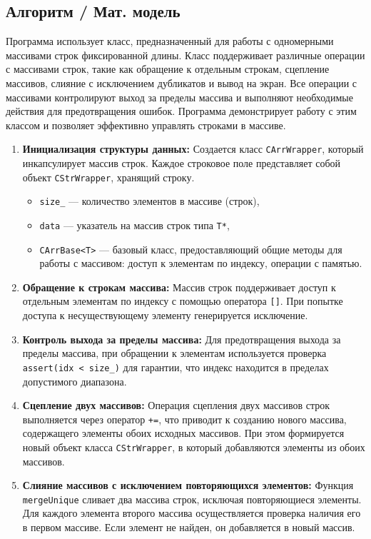 \documentclass[14pt,a4paper]{article}
\begin{document}
{\subsection{Алгоритм / Мат. модель}
Программа использует класс, предназначенный для работы с одномерными массивами
строк фиксированной длины. Класс поддерживает различные операции с массивами
строк, такие как обращение к отдельным строкам, сцепление массивов, слияние с
исключением дубликатов и вывод на экран. Все операции с массивами контролируют
выход за пределы массива и выполняют необходимые действия для предотвращения
ошибок. Программа демонстрирует работу с этим классом и позволяет эффективно
управлять строками в массиве.
\begin{enumerate}
  \item \textbf{Инициализация структуры данных:} Создается класс \texttt{CArrWrapper}, который инкапсулирует массив строк. Каждое строковое поле представляет собой объект \texttt{CStrWrapper}, хранящий строку.
    \begin{itemize}
      \item \texttt{size\_} — количество элементов в массиве (строк),
      \item \texttt{data} — указатель на массив строк типа \texttt{T*},
      \item \texttt{CArrBase<T>} — базовый класс, предоставляющий общие методы для работы с массивом: доступ к элементам по индексу, операции с памятью.
    \end{itemize}
  \item \textbf{Обращение к строкам массива:} Массив строк поддерживает доступ к отдельным элементам по индексу с помощью оператора \texttt{[]}. При попытке доступа к несуществующему элементу генерируется исключение.
  \item \textbf{Контроль выхода за пределы массива:} Для предотвращения выхода за пределы массива, при обращении к элементам используется проверка \texttt{assert(idx < size\_)} для гарантии, что индекс находится в пределах допустимого диапазона.
  \item \textbf{Сцепление двух массивов:} Операция сцепления двух массивов строк выполняется через оператор \texttt{+=}, что приводит к созданию нового массива, содержащего элементы обоих исходных массивов. При этом формируется новый объект класса \texttt{CStrWrapper}, в который добавляются элементы из обоих массивов.
  \item \textbf{Слияние массивов с исключением повторяющихся элементов:} Функция \texttt{mergeUnique} сливает два массива строк, исключая повторяющиеся элементы. Для каждого элемента второго массива осуществляется проверка наличия его в первом массиве. Если элемент не найден, он добавляется в новый массив.

\end{enumerate}}
\end{document}
